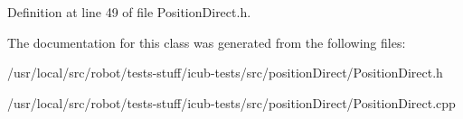 Definition at line 49 of file Position\-Direct.\-h.



The documentation for this class was generated from the following files\-:\begin{DoxyCompactItemize}
\item 
/usr/local/src/robot/tests-\/stuff/icub-\/tests/src/position\-Direct/Position\-Direct.\-h\item 
/usr/local/src/robot/tests-\/stuff/icub-\/tests/src/position\-Direct/Position\-Direct.\-cpp\end{DoxyCompactItemize}
